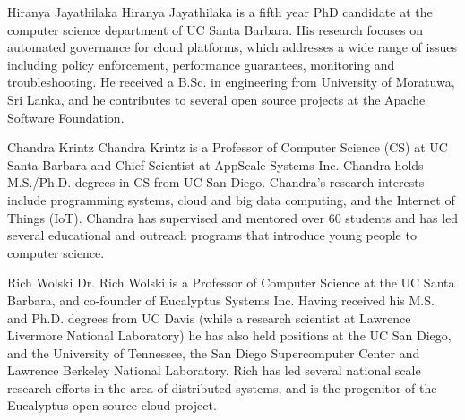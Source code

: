 \documentclass[10pt,journal,compsoc]{IEEEtran}
\begin{document}
\begin{IEEEbiography}{Hiranya Jayathilaka}
Hiranya Jayathilaka is a fifth year PhD candidate at the computer science department of UC Santa Barbara. His research focuses on automated governance
for cloud platforms, which addresses a wide range of issues including policy enforcement, performance guarantees, monitoring and troubleshooting. He received a
B.Sc. in engineering from University of Moratuwa, Sri Lanka, and he contributes to several open source projects at the Apache Software Foundation.
\end{IEEEbiography}

\begin{IEEEbiography}{Chandra Krintz}
Chandra Krintz is a Professor of Computer Science (CS) at UC Santa Barbara and Chief Scientist at AppScale Systems Inc. Chandra holds M.S./Ph.D. degrees in CS from UC San Diego.  Chandra's research interests include programming systems, cloud and big data computing, and the Internet of Things (IoT).  Chandra has supervised and mentored over 60 students and has led several educational and outreach programs that introduce young people to computer science.
\end{IEEEbiography}

\begin{IEEEbiography}{Rich Wolski}
Dr. Rich Wolski is a Professor of Computer Science at the UC Santa Barbara, and co-founder of Eucalyptus Systems Inc.  Having received his M.S. and Ph.D.  degrees from UC Davis (while a research scientist at Lawrence Livermore National Laboratory) he has also held positions at the UC San Diego, and the University of Tennessee, the San Diego Supercomputer Center and Lawrence Berkeley National Laboratory.  Rich has led several national scale research efforts in the area of distributed systems, and is the progenitor of the Eucalyptus open source cloud project.
\end{IEEEbiography}
\end{document}
